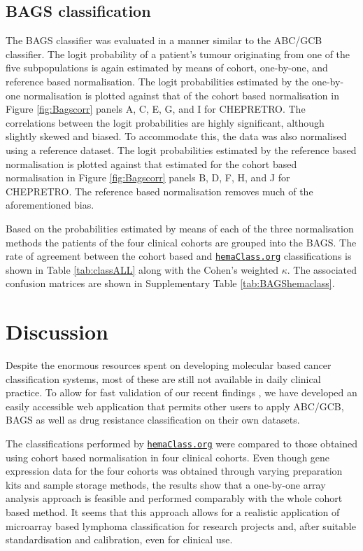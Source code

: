 \documentclass{bmcart}
\newcommand{\hemaClass}{\href{http://hemaClass.org}{\texttt{hemaClass.org}}}
\begin{document}
\subsection{BAGS classification}
The BAGS classifier was evaluated in a manner similar to the ABC/GCB classifier.
The logit probability of a patient's tumour originating from one of the five subpopulations is again estimated by means of cohort, one-by-one, and reference based normalisation.
The logit probabilities estimated by the one-by-one normalisation is plotted against that of the cohort based normalisation in Figure \ref{fig:Bagscorr} panels A, C, E, G, and I for CHEPRETRO.
The correlations between the logit probabilities are highly significant, although slightly skewed and biased.
To accommodate this, the data was also normalised using a reference dataset.
The logit probabilities estimated by the reference based normalisation is plotted against that estimated for the cohort based normalisation in Figure \ref{fig:Bagscorr} panels B, D, F, H, and J for CHEPRETRO.
The reference based normalisation removes much of the aforementioned bias.

Based on the probabilities estimated by means of each of the three normalisation methods the patients of the four clinical cohorts are grouped into the BAGS.
The rate of agreement between the cohort based and \hemaClass{} classifications is shown in Table \ref{tab:classALL} along with the Cohen's weighted $\kappa$.
The associated confusion matrices are shown in Supplementary Table \ref{tab:BAGShemaclass}.




\section{Discussion}
Despite the enormous resources spent on developing molecular based cancer classification systems,
most of these are still not available in daily clinical practice.
To allow for fast validation of our recent findings \citep{DybkaerBoegsted2015, Falgreen2015}, we have developed an easily accessible web application that permits other users to apply ABC/GCB, BAGS as well as drug resistance classification on their own datasets.

The classifications performed by \hemaClass{} were compared to those obtained using cohort based normalisation in four clinical cohorts.
Even though gene expression data for the four cohorts was obtained through varying preparation kits and sample storage methods, the results show that a one-by-one array analysis approach is feasible and performed comparably with the whole cohort based method.
It seems that this approach allows for a realistic application of microarray based lymphoma classification for research projects and, after suitable standardisation and calibration, even for clinical use.
\end{document}
